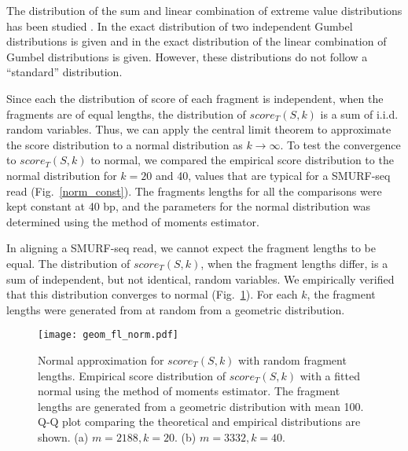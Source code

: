 The distribution of the sum and linear combination of extreme value
distributions has been studied \citep{cetinkaya2001scalable,
marques2015distribution,loaiciga1999analysis,nadarajah2008exact}.  In
\citep{loaiciga1999analysis} the exact distribution of two independent
Gumbel distributions is given and in \citep{nadarajah2008exact} the exact
distribution of the linear combination of Gumbel distributions is given.
%
However, these distributions do not follow a ``standard'' distribution.

Since each the distribution of score of each fragment is independent,
when the fragments are of equal lengths, the distribution of
$score_T(S,k)$ is a sum of i.i.d. random variables. Thus, we can apply
the central limit theorem to approximate the score distribution to a
normal distribution as $k \to \infty$. To test the convergence to
$score_T(S,k)$ to normal, we compared the empirical score distribution
to the normal distribution for $k = 20$ and 40, values that are typical
for a SMURF-seq read (Fig.~\ref{norm_const}). The fragments lengths for
all the comparisons were kept constant at 40 bp, and the parameters for
the normal distribution was determined using the method of moments
estimator.

In aligning a SMURF-seq read, we cannot expect the fragment lengths to
be equal. The distribution of $score_T(S,k)$, when the fragment lengths
differ, is a sum of independent, but not identical, random variables. We
empirically verified that this distribution converges to normal
(Fig.~\ref{norm_geom}). For each $k$, the fragment lengths were
generated from at random from a geometric distribution.

\begin{figure}[t!]
\centering
\texttt{[image: geom\_fl\_norm.pdf]}
\caption[Normal approximation for $score_T(S,k)$ with random fragment
  lengths]{
  Normal approximation for $score_T(S,k)$ with random fragment lengths.
  Empirical score distribution of $score_T(S,k)$ with a fitted
  normal using the method of moments estimator. The fragment lengths are
  generated from a geometric distribution with mean 100. Q-Q plot comparing
  the theoretical and empirical distributions are shown.
  (a) $m=2188, k=20$.
  (b) $m=3332, k=40$.}
\label{norm_geom}
\end{figure}



